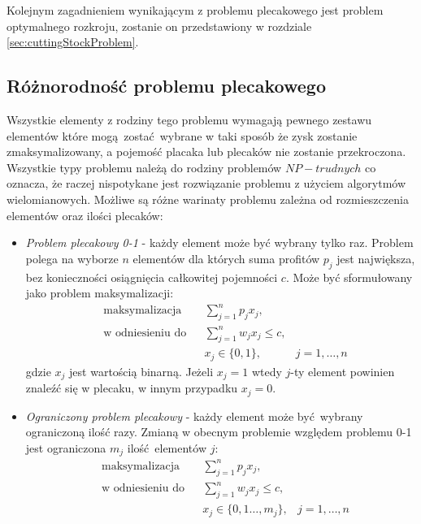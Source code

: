 Kolejnym zagadnieniem wynikającym z problemu plecakowego jest problem optymalnego rozkroju, zostanie on przedstawiony w rozdziale \cref{sec:cuttingStockProblem}.
\subsection{Różnorodność problemu plecakowego}
Wszystkie elementy z rodziny tego problemu wymagają pewnego zestawu elementów które mogą zostać wybrane w taki sposób że zysk zostanie zmaksymalizowany, a pojemość placaka lub plecaków nie zostanie przekroczona. Wszystkie typy problemu należą do rodziny problemów $NP-trudnych$ co oznacza, że raczej nispotykane jest rozwiązanie problemu z użyciem algorytmów wielomianowych. Możliwe są różne warinaty problemu zależna od rozmieszczenia elementów oraz ilości plecaków\cite{PisingerThesis}:
\begin{itemize}
  \item \textit{Problem plecakowy 0-1} - każdy element może być wybrany tylko raz. Problem polega na wyborze $n$ elementów dla których suma profitów $p_j$ jest największa, bez konieczności osiągnięcia całkowitej pojemności $c$. Może być sformułowany jako problem maksymalizacji:
  \begin{equation}\label{01Knapsack}
    \begin{aligned}
      & \textrm{maksymalizacja} & & \sum_{j=1}^n p_jx_j, \\
      & \textrm{w odniesieniu do} & & \sum_{j=1}^n w_jx_j \le c, \\
      &&& x_j \in \{0,1\},& j = 1,\dots,n
    \end{aligned}
  \end{equation}
  gdzie $x_j$ jest wartością binarną. Jeżeli $x_j = 1$ wtedy $j$-ty element powinien znaleźć się w plecaku, w innym przypadku $x_j = 0$.
  \item \textit{Ograniczony problem plecakowy} - każdy element może być wybrany ograniczoną ilość razy. Zmianą w obecnym problemie względem problemu 0-1 jest ograniczona $m_j$ ilość elementów $j$:
  \begin{equation}\label{boundedKnapsack}
    \begin{aligned}
      & \textrm{maksymalizacja} & & \sum_{j=1}^n p_jx_j, \\
      & \textrm{w odniesieniu do} & & \sum_{j=1}^n w_jx_j \le c, \\
      &&& x_j \in \{0,1\dots,m_j\},& j = 1,\dots,n
    \end{aligned}
  \end{equation}

\end{itemize}
